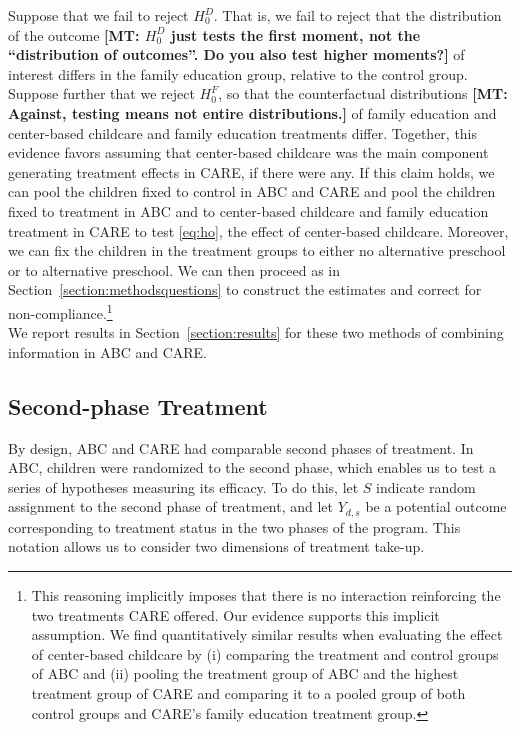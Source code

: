 \noindent Suppose that we fail to reject $H_{0}^D$. That is, we fail to reject that the distribution of the outcome \textbf{[MT: $H_{0}^D$ just tests the first moment, not the ``distribution of outcomes''. Do you also test higher moments?]} of interest differs in the family education group, relative to the control group. Suppose further that we reject $H_{0}^F$, so that the counterfactual distributions \textbf{[MT: Against, testing means not entire distributions.]} of family education and center-based childcare and family education treatments differ. Together, this evidence favors assuming that center-based childcare was the main component generating treatment effects in CARE, if there were any. If this claim holds, we can pool the children fixed to control in ABC and CARE and pool the children fixed to treatment in ABC and to center-based childcare and family education treatment in CARE to test \eqref{eq:ho}, the effect of center-based childcare. Moreover, we can fix the children in the treatment groups to either no alternative preschool or to alternative preschool. We can then proceed as in Section~\ref{section:methodsquestions} to construct the estimates and correct for non-compliance.\footnote{This reasoning implicitly imposes that there is no interaction reinforcing the two treatments CARE offered. Our evidence supports this implicit assumption. We find quantitatively similar results when evaluating the effect of center-based childcare by (i) comparing the treatment and control groups of ABC and (ii) pooling the treatment group of ABC and the highest treatment group of CARE and comparing it to a pooled group of both control groups and CARE's family education treatment group.}\\

\noindent We report results in Section~\ref{section:results} for these two methods of combining information in ABC and CARE.

\subsection{Second-phase Treatment}

\noindent By design, ABC and CARE had comparable second phases of treatment. In ABC, children were randomized to the second phase, which enables us to test a series of hypotheses measuring its efficacy. To do this, let $S$ indicate random assignment to the second phase of treatment, and let $Y_{d,s}$ be a potential outcome corresponding to treatment status in the two phases of the program. This notation allows us to consider two dimensions of treatment take-up.\\

